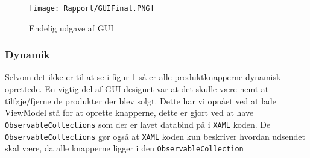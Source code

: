 \begin{figure}[H]
\centering
	\texttt{[image: Rapport/GUIFinal.PNG]}
	\caption{Endelig udgave af GUI}
	\label{fig:GUIFinal}
\end{figure}

\subsubsection{Dynamik}
Selvom det ikke er til at se i figur \ref{fig:GUIFinal} så er alle produktknapperne dynamisk oprettede. 
En vigtig del af GUI designet var at det skulle være nemt at tilføje/fjerne de produkter der blev solgt.
Dette har vi opnået ved at lade ViewModel stå for at oprette knapperne, dette er gjort ved at have \texttt{ObservableCollections} som der er lavet databind på i \texttt{XAML} koden.
De \texttt{ObservableCollections} gør også at \texttt{XAML} koden kun beskriver hvordan udsendet skal være, da alle knapperne ligger i den \texttt{ObservableCollection}